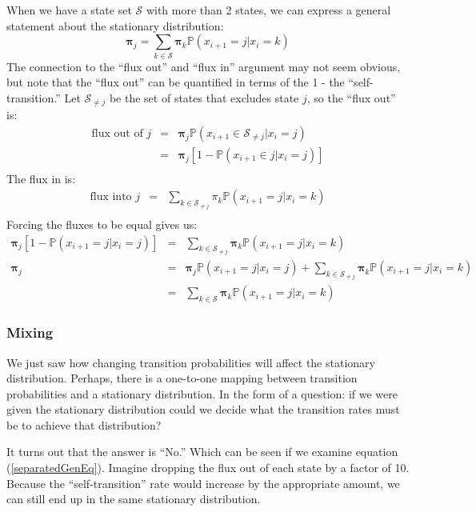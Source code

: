 \documentclass[11pt]{article}
\renewcommand{\Pr}{{\mathbb P}}
\begin{document}
When we have a state set $\mathcal{S}$ with more than 2 states, we can express a general statement about the stationary distribution:
\begin{equation}
	\bm\pi_j = \sum_{k\in \mathcal{S}}\bm\pi_{k}\Pr(x_{i+1} = j|x_{i} = k) \label{generalEquil}
\end{equation}
The connection to the ``flux out'' and ``flux in'' argument may not seem obvious, but note that the ``flux out'' can be 
quantified in terms of the 1 - the ``self-transition.''
Let $\mathcal{S}_{\neq j}$ be the set of states that excludes state $j$, so the ``flux out'' is:
\begin{eqnarray*}
	\mbox{flux out of } j & = & \bm\pi_j\Pr(x_{i+1}\in\mathcal{S}_{\neq j}|x_i=j) \\
	 & = &  \bm\pi_j\left[1 - \Pr(x_{i+1}\in j|x_i=j)\right]\\
\end{eqnarray*}
The flux in is:
\begin{eqnarray*}
	\mbox{flux into } j & = & \sum_{k\in \mathcal{S}_{\neq j}}\pi_{k}\Pr(x_{i+1} = j|x_{i} = k) \\
\end{eqnarray*}
Forcing the fluxes to be equal gives us:
\begin{eqnarray}
	\bm\pi_j\left[1 - \Pr(x_{i+1} =  j|x_i=j)\right] & = & \sum_{k\in \mathcal{S}_{\neq j}}\bm\pi_{k}\Pr(x_{i+1} = j|x_{i} = k) \nonumber \\
	\bm\pi_j & = &  \bm\pi_j\Pr(x_{i+1} =  j|x_i=j) + \sum_{k\in\mathcal{S}_{\neq j}}\bm \pi_{k}\Pr(x_{i+1} = j|x_{i} = k)    \label{separatedGenEq} \\
	& = & \sum_{k\in\mathcal{S}}\bm \pi_{k}\Pr(x_{i+1} = j|x_{i} = k) \nonumber
\end{eqnarray}



\subsubsection*{Mixing}
We just saw how changing transition probabilities will affect the stationary distribution. 
Perhaps, there is a one-to-one mapping between transition probabilities and a stationary distribution.
In the form of a question: if we were given the stationary distribution could we decide what the transition rates must be to achieve that distribution?

It turns out that the answer is ``No.''  
Which can be seen if we examine equation (\ref{separatedGenEq}).
Imagine dropping the flux out of each state by a factor of 10.
Because the ``self-transition'' rate would increase by the appropriate amount, we can still end up in the same stationary distribution.
\end{document}
